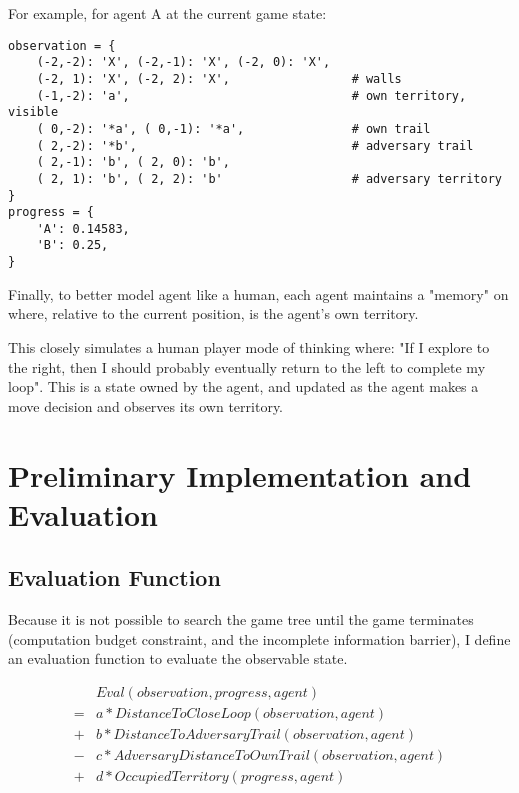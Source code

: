 \documentclass[10pt]{article}
\begin{document}
For example, for agent A at the current game state:

\begin{verbatim}
observation = {
    (-2,-2): 'X', (-2,-1): 'X', (-2, 0): 'X', 
    (-2, 1): 'X', (-2, 2): 'X',                 # walls
    (-1,-2): 'a',                               # own territory, visible
    ( 0,-2): '*a', ( 0,-1): '*a',               # own trail
    ( 2,-2): '*b',                              # adversary trail
    ( 2,-1): 'b', ( 2, 0): 'b', 
    ( 2, 1): 'b', ( 2, 2): 'b'                  # adversary territory
}
progress = {
    'A': 0.14583,
    'B': 0.25,
}
\end{verbatim}

Finally, to better model agent like a human, each agent maintains a "memory" on where, relative to the current position, is the agent's own territory. 

This closely simulates a human player mode of thinking where: "If I explore to the right, then I should probably eventually return to the left to complete my loop". This is a state owned by the agent, and updated as the agent makes a move decision and observes its own territory.

\section{Preliminary Implementation and Evaluation}

\subsection{Evaluation Function}

Because it is not possible to search the game tree until the game terminates (computation budget constraint, and the incomplete information barrier), I define an evaluation function to evaluate the observable state.

\begin{equation}
\begin{split}
    & Eval(observation, progress, agent) \\
    =&
    a * DistanceToCloseLoop(observation, agent) \\
    +&
    b * DistanceToAdversaryTrail(observation, agent) \\
    -&
    c * AdversaryDistanceToOwnTrail(observation, agent) \\
    +&
    d * OccupiedTerritory(progress, agent)
\end{split}
\end{equation}
\end{document}
